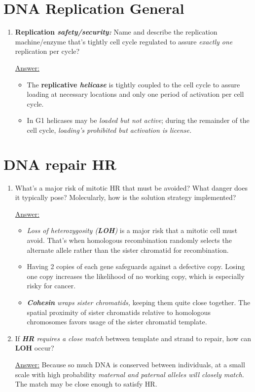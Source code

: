 \documentclass{article}
\newenvironment{QandA}{\begin{enumerate}[label=\bfseries Q\arabic*.]}
                       {\end{enumerate}}
\newenvironment{answered}{\par\normalfont\underline{Answer:}}{}
\begin{document}
\section{DNA Replication General}
\begin{QandA}
  \item{\textbf{Replication \textit{safety/security:}} Name and describe the replication machine/enzyme that's tightly cell cycle regulated to assure \textit{exactly one} replication per cycle?}
    \begin{answered}
    \begin{itemize}
      \item{The \textbf{replicative \textit{helicase}} is tightly coupled to the cell cycle to assure loading at necessary locations and only one period of activation per cell cycle.}
      \item{In G1 helicases may be \textit{loaded but not active}; during the remainder of the cell cycle, \textit{loading's prohibited but activation is license.}}
    \end{itemize}
    \end{answered}
\end{QandA}
\section{DNA repair HR}
\begin{QandA}
  \item{What's a major risk of mitotic HR that must be avoided? What danger does it typically pose? Molecularly, how is the solution strategy implemented?}
    \begin{answered}
    \begin{itemize}
      \item{\textit{Loss of heterozygosity (\textbf{LOH})} is a major risk that a mitotic cell must avoid. That's when homologous recombination randomly selects the alternate allele rather than the sister chromatid for recombination.}
      \item{Having 2 copies of each gene safeguards against a defective copy. Losing one copy increases the likelihood of no working copy, which is especially risky for cancer.}
      \item{\textit{\textbf{Cohesin} wraps sister chromatids,} keeping them quite close together. The spatial proximity of sister chromatids relative to homologous chromosomes favors usage of the sister chromatid template.}
    \end{itemize}
    \end{answered}
  \item{If \textit{\textbf{HR} requires a close match} between template and strand to repair, how can \textbf{LOH} occur?}
    \begin{answered}
    Because so much DNA is conserved between individuals, at a small scale with high probability \textit{maternal and paternal alleles will closely match.} The match may be close enough to satisfy HR.
    \end{answered}
\end{QandA}
\end{document}
